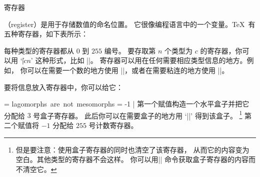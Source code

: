 {{{{{{{{{{%
\concept 寄存器

（register）是用于存储数值的命名位置。
它很像编程语言中的一个变量。\TeX\ 有五种寄存器，如下表所示：


每种类型的寄存器都从 $0$ 到 $255$ 编号。
要存取第 $n$ 个类型为 $c$ 的寄存器，你可以用 `|\|$cn$' 这种形式，比如 ||。
寄存器可以用在任何需要相应类型信息的地方。例如，
你可以在需要一个数的地方使用 ||，或者在需要粘连的地方使用 ||。

要将信息放入寄存器中，你可以给它：

\csdisplay
{} = \hbox{lagomorphs are not mesomorphs}
 = -1
|
第一个赋值构造一个水平盒子并把它分配给 $3$ 号盒子寄存器。
此后你可以在需要盒子的地方用 `||' 得到该盒子。
\footnote{但是要注意：使用盒子寄存器的同时也清空了该寄存器，
从而它的内容变为空白。其他类型的寄存器不会这样。
你可以用|\copy| 命令\ctsref{\copy}获取盒子寄存器的内容而不清空它。}
第二个赋值将 $-1$ 分配给 $255$ 号计数寄存器。

}}}}}}}}}}
